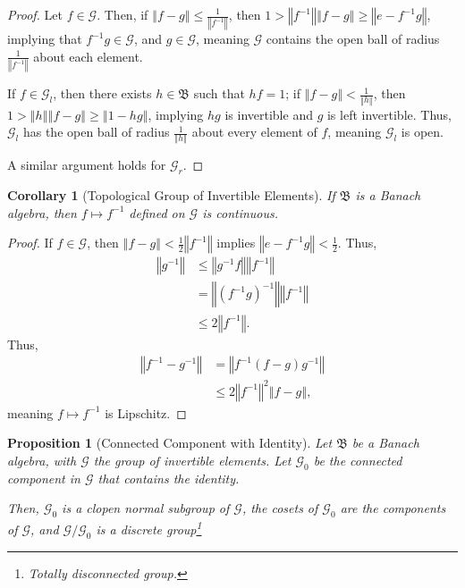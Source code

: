 \documentclass[10pt]{extarticle}
\newcommand{\norm}[1]{\left\Vert #1\right\Vert}
\theoremstyle{plain}
\newtheorem*{corollary}{Corollary}
\newtheorem*{proposition}{Proposition}
\theoremstyle{definition}
\theoremstyle{note}
\renewcommand{\newline}{\hfill\break}
\begin{document}
\begin{proof}
  Let $f\in \mathcal{G}$. Then, if $\norm{f-g} \leq \frac{1}{\norm{f^{-1}}}$, then $1 > \norm{f^{-1}}\norm{f-g} \geq \norm{e-f^{-1}g}$, implying that $f^{-1}g \in \mathcal{G}$, and $g\in \mathcal{G}$, meaning $\mathcal{G}$ contains the open ball of radius $\frac{1}{\norm{f^{-1}}}$ about each element.\newline

  If $f\in \mathcal{G}_{l}$, then there exists $h\in \mathfrak{B}$ such that $hf = 1$; if $\norm{f-g} < \frac{1}{\norm{h}}$, then $1 > \norm{h}\norm{f-g} \geq \norm{1-hg}$, implying $hg$ is invertible and $g$ is left invertible. Thus, $\mathcal{G}_{l}$ has the open ball of radius $\frac{1}{\norm{h}}$ about every element of $f$, meaning $\mathcal{G}_{l}$ is open.\newline

  A similar argument holds for $\mathcal{G}_{r}$.
\end{proof}
\begin{corollary}[Topological Group of Invertible Elements]
  If $\mathfrak{B}$ is a Banach algebra, then $f\mapsto f^{-1}$ defined on $\mathcal{G}$ is continuous.
\end{corollary}
\begin{proof}
  If $f\in \mathcal{G}$, then $\norm{f-g} < \frac{1}{2}\norm{f^{-1}}$ implies $\norm{e-f^{-1}g} < \frac{1}{2}$. Thus,
  \begin{align*}
    \norm{g^{-1}} &\leq \norm{g^{-1}f}\norm{f^{-1}}\\
                  &= \norm{\left(f^{-1}g\right)^{-1}}\norm{f^{-1}}\\
                  &\leq 2\norm{f^{-1}}.
  \end{align*}
  Thus,
  \begin{align*}
    \norm{f^{-1}-g^{-1}} &= \norm{f^{-1}\left(f-g\right)g^{-1}}\\
                         &\leq 2\norm{f^{-1}}^2\norm{f-g},
  \end{align*}
  meaning $f\mapsto f^{-1}$ is Lipschitz.
\end{proof}
\begin{proposition}[Connected Component with Identity]
  Let $\mathfrak{B}$ be a Banach algebra, with $\mathcal{G}$ the group of invertible elements. Let $\mathcal{G}_0$ be the connected component in $\mathcal{G}$ that contains the identity.\newline

  Then, $\mathcal{G}_0$ is a clopen normal subgroup of $\mathcal{G}$, the cosets of $\mathcal{G}_0$ are the components of $\mathcal{G}$, and $\mathcal{G}/\mathcal{G}_0$ is a discrete group\footnote{Totally disconnected group.}
\end{proposition}
\end{document}
